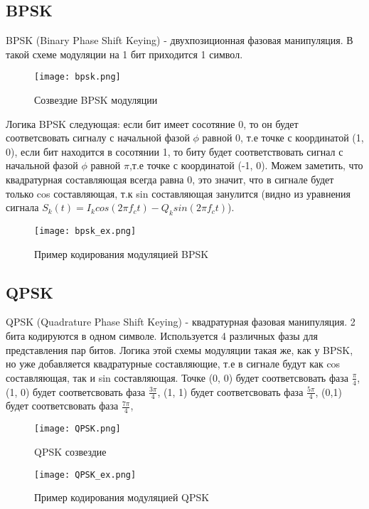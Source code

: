 \subsection*{\textbf{BPSK}}

BPSK (Binary Phase Shift Keying) - двухпозиционная фазовая манипуляция. В такой схеме модуляции на 1 бит приходится 1 символ.

\begin{figure}[H]
    \centering
    \texttt{[image: bpsk.png]}
    \caption{Созвездие BPSK модуляции}
\end{figure}

Логика BPSK следующая: если бит имеет сосотяние 0, то он будет соответсвовать сигналу с начальной фазой $\phi$ равной 0, т.е точке
с координатой (1, 0), если бит находится в сосотянии 1, то биту будет соответствовать сигнал с начальной фазой $\phi$ равной $\pi$,т.е 
точке с координатой (-1, 0). Можем заметить, что квадратурная составляющая всегда равна 0, это значит, что в сигнале будет только
cos составляющая, т.к sin составляющая занулится (видно из уравнения сигнала $S_k(t) = I_kcos(2\pi f_ct) - Q_ksin(2\pi f_ct)$).

\begin{figure}[H]
    \centering
    \texttt{[image: bpsk\_ex.png]}
    \caption{Пример кодирования модуляцией BPSK}
\end{figure}

\subsection*{\textbf{QPSK}}

QPSK (Quadrature Phase Shift Keying) - квадратурная фазовая манипуляция. 2 бита кодируются в одном символе. Используется 4 
различных фазы для представления пар битов. Логика этой схемы модуляции такая же, как у BPSK, но уже добавляется квадратурные
составляющие, т.е в сигнале будут как cos составляющая, так и sin составляющая. Точке (0, 0) будет соответсвовать фаза $\frac{\pi}{4}$,
(1, 0) будет соответсвовать фаза $\frac{3\pi}{4}$, (1, 1) будет соответсвовать фаза $\frac{5\pi}{4}$, (0,1) будет соответсвовать фаза $\frac{7\pi}{4}$,

\begin{figure}[H]
    \centering
    \texttt{[image: QPSK.png]}
    \caption{QPSK созвездие}
\end{figure}

\begin{figure}[H]
    \centering
    \texttt{[image: QPSK\_ex.png]}
    \caption{Пример кодирования модуляцией QPSK}
\end{figure}


\endinput

